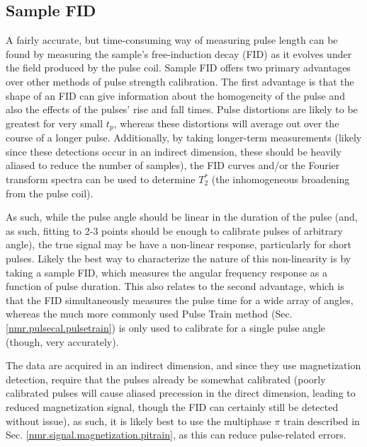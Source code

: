 \documentclass[PaulGanssle-Thesis.tex]{subfiles}
\begin{document}
\subsection{Sample FID}
\label{nmr.pulsecal.FID}
A fairly accurate, but time-consuming way of measuring pulse length can be found by measuring the sample's free-induction decay (FID) as it evolves under the field produced by the pulse coil. Sample FID offers two primary advantages over other methods of pulse strength calibration. The first advantage is that the shape of an FID can give information about the homogeneity of the pulse and also the effects of the pulses' rise and fall times. Pulse distortions are likely to be greatest for very small $t_{p}$, whereas these distortions will average out over the course of a longer pulse. Additionally, by taking longer-term measurements (likely since these detections occur in an indirect dimension, these should be heavily aliased to reduce the number of samples), the FID curves and/or the Fourier transform spectra can be used to determine $T_{2}^*$ (the inhomogeneous broadening from the pulse coil).

 As such, while the pulse angle should be linear in the duration of the pulse (and, as such, fitting to 2-3 points should be enough to calibrate pulses of arbitrary angle), the true signal may be have a non-linear response, particularly for short pulses. Likely the best way to characterize the nature of this non-linearity is by taking a sample FID, which measures the angular frequency response as a function of pulse duration. This also relates to the second advantage, which is that the FID simultaneously measures the pulse time for a wide array of angles, whereas the much more commonly used Pulse Train method (Sec. \ref{nmr.pulsecal.pulsetrain}) is only used to calibrate for a single pulse angle (though, very accurately).

The data are acquired in an indirect dimension, and since they use magnetization detection, require that the pulses already be somewhat calibrated (poorly calibrated pulses will cause aliased precession in the direct dimension, leading to reduced magnetization signal, though the FID can certainly still be detected without issue), as such, it is likely best to use the multiphase $\pi$ train described in Sec. \ref{nmr.signal.magnetization.pitrain}, as this can reduce pulse-related errors.
\end{document}
